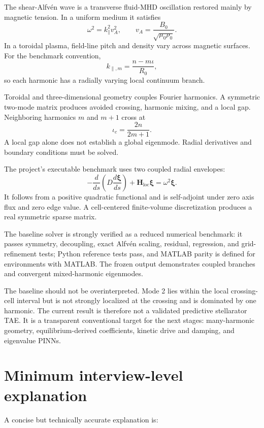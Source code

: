 The shear-Alfv\'en wave is a transverse fluid-MHD oscillation restored mainly by magnetic tension. In a uniform medium it satisfies
\begin{equation}
\omega^2=k_\parallel^2v_A^2,
\qquad
v_A=\frac{B_0}{\sqrt{\mu_0\rho_0}}.
\end{equation}
In a toroidal plasma, field-line pitch and density vary across magnetic surfaces. For the benchmark convention,
\begin{equation}
k_{\parallel,m}=\frac{n-m\iota}{R_0},
\end{equation}
so each harmonic has a radially varying local continuum branch.

Toroidal and three-dimensional geometry couples Fourier harmonics. A symmetric two-mode matrix produces avoided crossing, harmonic mixing, and a local gap. Neighboring harmonics $m$ and $m+1$ cross at
\begin{equation}
\iota_c=\frac{2n}{2m+1}.
\end{equation}
A local gap alone does not establish a global eigenmode. Radial derivatives and boundary conditions must be solved.

The project's executable benchmark uses two coupled radial envelopes:
\begin{equation}
-\frac{d}{ds}\left(D\frac{d\boldsymbol\xi}{ds}\right)
+\mathbf H_{\mathrm{loc}}\boldsymbol\xi
=\omega^2\boldsymbol\xi.
\end{equation}
It follows from a positive quadratic functional and is self-adjoint under zero axis flux and zero edge value. A cell-centered finite-volume discretization produces a real symmetric sparse matrix.

The baseline solver is strongly verified as a reduced numerical benchmark: it passes symmetry, decoupling, exact Alfv\'en scaling, residual, regression, and grid-refinement tests; Python reference tests pass, and MATLAB parity is defined for environments with MATLAB. The frozen output demonstrates coupled branches and convergent mixed-harmonic eigenmodes.

The baseline should not be overinterpreted. Mode 2 lies within the local crossing-cell interval but is not strongly localized at the crossing and is dominated by one harmonic. The current result is therefore not a validated predictive stellarator TAE. It is a transparent conventional target for the next stages: many-harmonic geometry, equilibrium-derived coefficients, kinetic drive and damping, and eigenvalue PINNs.

\section{Minimum interview-level explanation}
A concise but technically accurate explanation is:


